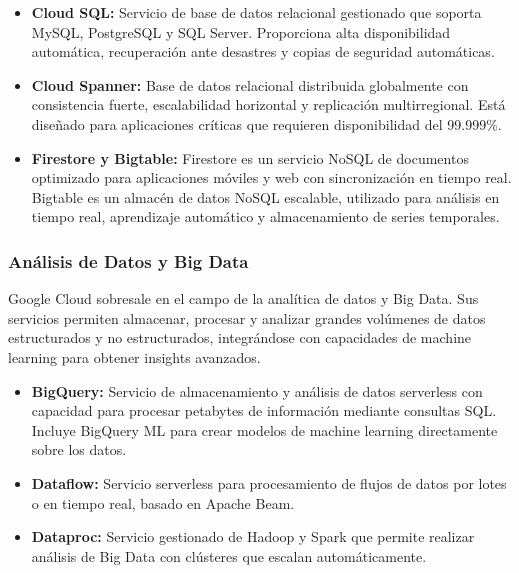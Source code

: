 {                \begin{itemize}
                    \item \textbf{Cloud SQL:} Servicio de base de datos relacional gestionado que soporta MySQL, PostgreSQL y SQL Server. Proporciona alta disponibilidad automática, recuperación ante desastres y copias de seguridad automáticas.
                    \item \textbf{Cloud Spanner:} Base de datos relacional distribuida globalmente con consistencia fuerte, escalabilidad horizontal y replicación multirregional. Está diseñado para aplicaciones críticas que requieren disponibilidad del 99.999\%.
                    \item \textbf{Firestore y Bigtable:} Firestore es un servicio NoSQL de documentos optimizado para aplicaciones móviles y web con sincronización en tiempo real. Bigtable es un almacén de datos NoSQL escalable, utilizado para análisis en tiempo real, aprendizaje automático y almacenamiento de series temporales.
                \end{itemize}
            
            \subsubsection{Análisis de Datos y Big Data}
                Google Cloud sobresale en el campo de la analítica de datos y Big Data. Sus servicios permiten almacenar, procesar y analizar grandes volúmenes de datos estructurados y no estructurados, integrándose con capacidades de machine learning para obtener insights avanzados.
                
                \begin{itemize}
                    \item \textbf{BigQuery:} Servicio de almacenamiento y análisis de datos serverless con capacidad para procesar petabytes de información mediante consultas SQL. Incluye BigQuery ML para crear modelos de machine learning directamente sobre los datos.
                    \item \textbf{Dataflow:} Servicio serverless para procesamiento de flujos de datos por lotes o en tiempo real, basado en Apache Beam.
                    \item \textbf{Dataproc:} Servicio gestionado de Hadoop y Spark que permite realizar análisis de Big Data con clústeres que escalan automáticamente.
                \end{itemize}
                
}
